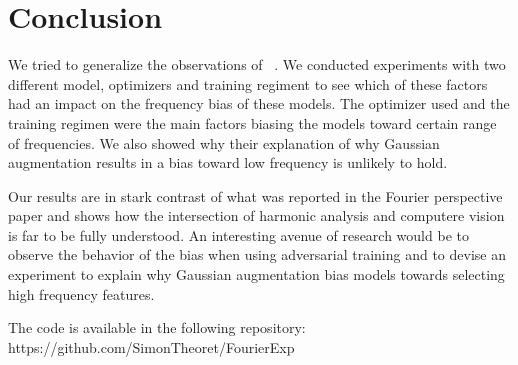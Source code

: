 \documentclass{article} \author{Simon Théorêt}
\begin{document}
\section{Conclusion}
We tried to generalize the observations of ~\citep{yin2020fourier}.
We conducted experiments with two different model, optimizers and
training regiment to see which of these factors had an impact on the
frequency bias of these models. The optimizer used and the training
regimen were the main factors biasing the models toward certain range
of frequencies. We also showed why their explanation of why Gaussian
augmentation results in a bias toward low frequency is unlikely to
hold.

Our results are in stark contrast of what was reported in the Fourier
perspective paper and shows how the intersection of harmonic analysis
and computere vision is far to be fully understood. An interesting
avenue of research would be to observe the behavior of the bias when
using adversarial training and to devise an experiment to explain why
Gaussian augmentation bias models towards selecting high frequency
features.

The code is available in the following repository:
https://github.com/SimonTheoret/FourierExp



\end{document}
